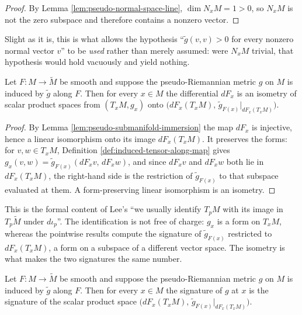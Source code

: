 \begin{proof}
\leanok
{}
By Lemma \ref{lem:pseudo-normal-space-line}, $\dim N_xM = 1 > 0$, so $N_xM$ is not the zero subspace and therefore contains a nonzero vector.
\end{proof}

Slight as it is, this is what allows the hypothesis ``$\tilde{g}(v,v) > 0$ for every nonzero normal vector $v$'' to be \emph{used} rather than merely assumed: were $N_xM$ trivial, that hypothesis would hold vacuously and yield nothing.

\begin{lemma}
\label{lem:differential-isometry-tangent-range}
\leanok
{}
Let $F : M \to \tilde{M}$ be smooth and suppose the pseudo-Riemannian metric $g$ on $M$ is induced by $\tilde{g}$ along $F$. Then for every $x \in M$ the differential $dF_x$ is an isometry of scalar product spaces from $(T_xM, g_x)$ onto $\bigl(dF_x(T_xM),\, \tilde{g}_{F(x)}|_{dF_x(T_xM)}\bigr)$.
\end{lemma}

\begin{proof}
\leanok
{}
By Lemma \ref{lem:pseudo-submanifold-immersion} the map $dF_x$ is injective, hence a linear isomorphism onto its image $dF_x(T_xM)$. It preserves the forms: for $v,w \in T_xM$, Definition \ref{def:induced-tensor-along-map} gives $g_x(v,w) = \tilde{g}_{F(x)}(dF_xv,\, dF_xw)$, and since $dF_xv$ and $dF_xw$ both lie in $dF_x(T_xM)$, the right-hand side is the restriction of $\tilde{g}_{F(x)}$ to that subspace evaluated at them. A form-preserving linear isomorphism is an isometry.
\end{proof}

This is the formal content of Lee's ``we usually identify $T_pM$ with its image in $T_p\tilde{M}$ under $d\iota_p$''. The identification is not free of charge: $g_x$ is a form on $T_xM$, whereas the pointwise results compute the signature of $\tilde{g}_{F(x)}$ restricted to $dF_x(T_xM)$, a form on a subspace of a different vector space. The isometry is what makes the two signatures the same number.

\begin{lemma}
\label{lem:submanifold-signature-in-ambient-fibre}
\leanok
{}
Let $F : M \to \tilde{M}$ be smooth and suppose the pseudo-Riemannian metric $g$ on $M$ is induced by $\tilde{g}$ along $F$. Then for every $x \in M$ the signature of $g$ at $x$ is the signature of the scalar product space $\bigl(dF_x(T_xM),\, \tilde{g}_{F(x)}|_{dF_x(T_xM)}\bigr)$.
\end{lemma}

